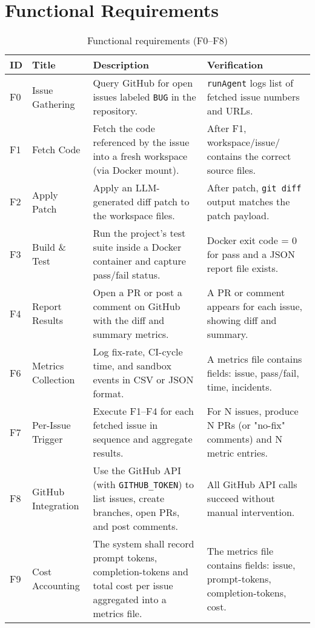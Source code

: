 \section{Functional Requirements}

\begin{table}[ht]
    \centering
    \small
    \begin{tabular*}{\textwidth}{@{\extracolsep{\fill}} p{1cm} p{2cm} p{7cm} p{4cm} @{}}
        \toprule
        \textbf{ID} & \textbf{Title} & \textbf{Description} & \textbf{Verification} \\
        \midrule
        F0 & Issue Gathering
        & Query GitHub for open issues labeled \texttt{BUG} in the repository.
        & \texttt{runAgent} logs list of fetched issue numbers and URLs. \\[4pt]
        F1 & Fetch Code
        & Fetch the code referenced by the issue into a fresh workspace (via Docker mount).
        & After F1, workspace/issue/ contains the correct source files. \\[4pt]
        F2 & Apply Patch
        & Apply an LLM-generated diff patch to the workspace files.
        & After patch, \texttt{git diff} output matches the patch payload. \\[4pt]
        F3 & Build \& Test
        & Run the project's test suite inside a Docker container and capture pass/fail status.
        & Docker exit code = 0 for pass and a JSON report file exists. \\[4pt]
        F4 & Report Results
        & Open a PR or post a comment on GitHub with the diff and summary metrics.
        & A PR or comment appears for each issue, showing diff and summary. \\[4pt]
        F6 & Metrics Collection
        & Log fix-rate, CI-cycle time, and sandbox events in CSV or JSON format.
        & A metrics file contains fields: issue, pass/fail, time, incidents. \\[4pt]
        F7 & Per-Issue Trigger
        & Execute F1--F4 for each fetched issue in sequence and aggregate results.
        & For N issues, produce N PRs (or "no-fix" comments) and N metric entries. \\[4pt]
        F8 & GitHub Integration
        & Use the GitHub API (with \texttt{GITHUB\_TOKEN}) to list issues, create branches, open PRs, and post comments.
        & All GitHub API calls succeed without manual intervention. \\ [4pt]
        F9 & Cost Accounting
        & The system shall record prompt tokens, completion-tokens and total cost per issue aggregated into a metrics file.
        & The metrics file contains fields: issue, prompt-tokens, completion-tokens, cost. \\[4pt]
        \bottomrule
    \end{tabular*}
    \caption{Functional requirements (F0--F8)}
\end{table}

